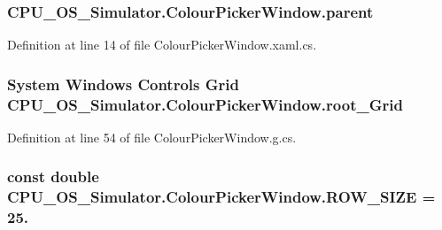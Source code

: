 \subsubsection[{parent}]{ C\+P\+U\+\_\+\+O\+S\+\_\+\+Simulator.\+Colour\+Picker\+Window.\+parent\hspace{0.3cm}{\ttfamily [private]}}\label{class_c_p_u___o_s___simulator_1_1_colour_picker_window_a0a40b478316b3e45a63c67347ff9fc63}


Definition at line 14 of file Colour\+Picker\+Window.\+xaml.\+cs.

\hypertarget{class_c_p_u___o_s___simulator_1_1_colour_picker_window_ad3f58999085d75f00e86e4796aa87ed3}{}
\subsubsection[{root\+\_\+\+Grid}]{\setlength{\rightskip}{0pt plus 5cm}System Windows Controls Grid C\+P\+U\+\_\+\+O\+S\+\_\+\+Simulator.\+Colour\+Picker\+Window.\+root\+\_\+\+Grid\hspace{0.3cm}{\ttfamily [package]}}\label{class_c_p_u___o_s___simulator_1_1_colour_picker_window_ad3f58999085d75f00e86e4796aa87ed3}


Definition at line 54 of file Colour\+Picker\+Window.\+g.\+cs.

\hypertarget{class_c_p_u___o_s___simulator_1_1_colour_picker_window_a82dedb596267fba0813f7d710d96e6af}{}
\subsubsection[{R\+O\+W\+\_\+\+S\+I\+Z\+E}]{\setlength{\rightskip}{0pt plus 5cm}const double C\+P\+U\+\_\+\+O\+S\+\_\+\+Simulator.\+Colour\+Picker\+Window.\+R\+O\+W\+\_\+\+S\+I\+Z\+E = 25.\hspace{0.3cm}{\ttfamily [private]}}\label{class_c_p_u___o_s___simulator_1_1_colour_picker_window_a82dedb596267fba0813f7d710d96e6af}


